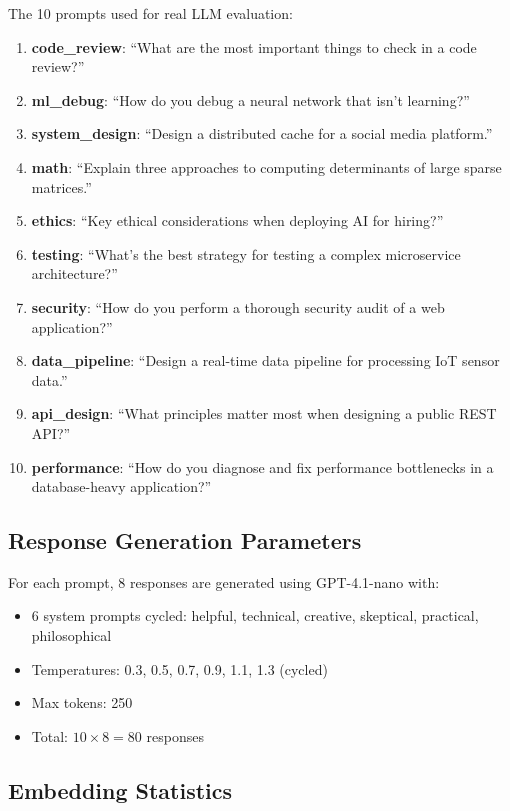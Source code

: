 \documentclass[10pt]{article}
\begin{document}
The 10 prompts used for real LLM evaluation:
\begin{enumerate}[leftmargin=*,itemsep=1pt]
\item \textbf{code\_review}: ``What are the most important things to check in a code review?''
\item \textbf{ml\_debug}: ``How do you debug a neural network that isn't learning?''
\item \textbf{system\_design}: ``Design a distributed cache for a social media platform.''
\item \textbf{math}: ``Explain three approaches to computing determinants of large sparse matrices.''
\item \textbf{ethics}: ``Key ethical considerations when deploying AI for hiring?''
\item \textbf{testing}: ``What's the best strategy for testing a complex microservice architecture?''
\item \textbf{security}: ``How do you perform a thorough security audit of a web application?''
\item \textbf{data\_pipeline}: ``Design a real-time data pipeline for processing IoT sensor data.''
\item \textbf{api\_design}: ``What principles matter most when designing a public REST API?''
\item \textbf{performance}: ``How do you diagnose and fix performance bottlenecks in a database-heavy application?''
\end{enumerate}

\subsection{Response Generation Parameters}

For each prompt, 8 responses are generated using GPT-4.1-nano with:
\begin{itemize}[leftmargin=*,itemsep=1pt]
\item 6 system prompts cycled: helpful, technical, creative, skeptical, practical, philosophical
\item Temperatures: 0.3, 0.5, 0.7, 0.9, 1.1, 1.3 (cycled)
\item Max tokens: 250
\item Total: $10 \times 8 = 80$ responses
\end{itemize}

\subsection{Embedding Statistics}
\end{document}
